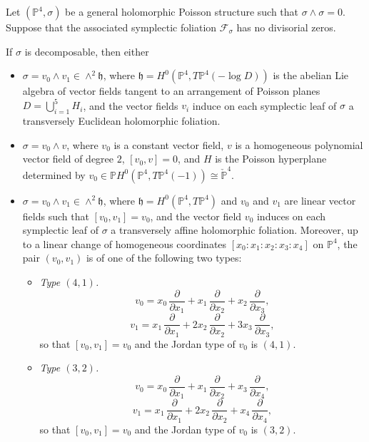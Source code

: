 \documentclass[twoside]{amsart}
\numberwithin{equation}{section}
\def\PP{{\mathbb{P}}}
\newcommand{\sF}{\mathscr{F}}
\newenvironment{corintro}[1]
{\renewcommand\theinnercorintro{#1}\innercorintro}
{\endinnercorintro}
\theoremstyle{definition}
\begin{document}
\begin{corintro}{C}\label{Cor:Poisson}
Let $(\PP^{4}, \sigma)$ be a general holomorphic Poisson structure such that
$\sigma \wedge \sigma = 0$. Suppose that the associated symplectic foliation
$\sF_\sigma$ has no divisorial zeros.

If $\sigma$ is decomposable, then either
\begin{itemize}
  \item $\sigma = v_0 \wedge v_1 \in \wedge^2 \mathfrak{h}$, where
  $\mathfrak{h} = H^0(\PP^{4}, T\PP^{4}(-\log D))$ is the abelian Lie algebra
  of vector fields tangent to an arrangement of Poisson planes
  $D = \bigcup_{i=1}^{5} H_i$, and the vector fields $v_i$ induce on each
  symplectic leaf of $\sigma$ a transversely Euclidean holomorphic foliation.

  \item $\sigma = v_0 \wedge v$, where $v_0$ is a constant vector field,
  $v$ is a homogeneous polynomial vector field of degree $2$, $[v_0,v]=0$,
  and $H$ is the Poisson hyperplane determined by
  $v_0 \in \PP H^0(\PP^{4}, T\PP^{4}(-1)) \cong \check{\PP}^{4}$.

  \item $\sigma = v_0 \wedge v_1 \in \wedge^2 \mathfrak{h}$, where
  $\mathfrak{h} = H^0(\PP^{4}, T\PP^{4})$ and $v_0$ and $v_1$ are linear
  vector fields such that $[v_0,v_1]=v_0$, and the vector field $v_0$ induces
  on each symplectic leaf of $\sigma$ a transversely affine holomorphic foliation.
  Moreover, up to a linear change of homogeneous coordinates
  $[x_0:x_1:x_2:x_3:x_4]$ on $\PP^4$, the pair $(v_0,v_1)$ is of one of the
  following two types:

  \begin{itemize}
    \item[\textup{(I)}] \emph{Type $(4,1)$.}
    \[
      v_0
      =
      x_0\,\frac{\partial}{\partial x_1}
      +
      x_1\,\frac{\partial}{\partial x_2}
      +
      x_2\,\frac{\partial}{\partial x_3},
    \]
    \[
      v_1
      =
      x_1\,\frac{\partial}{\partial x_1}
      +
      2x_2\,\frac{\partial}{\partial x_2}
      +
      3x_3\,\frac{\partial}{\partial x_3},
    \]
    so that $[v_0,v_1]=v_0$ and the Jordan type of $v_0$ is $(4,1)$.

    \item[\textup{(II)}] \emph{Type $(3,2)$.}
    \[
      v_0
      =
      x_0\,\frac{\partial}{\partial x_1}
      +
      x_1\,\frac{\partial}{\partial x_2}
      +
      x_3\,\frac{\partial}{\partial x_4},
    \]
    \[
      v_1
      =
      x_1\,\frac{\partial}{\partial x_1}
      +
      2x_2\,\frac{\partial}{\partial x_2}
      +
      x_4\,\frac{\partial}{\partial x_4},
    \]
    so that $[v_0,v_1]=v_0$ and the Jordan type of $v_0$ is $(3,2)$.
  \end{itemize}
\end{itemize}


\end{corintro}
\end{document}
